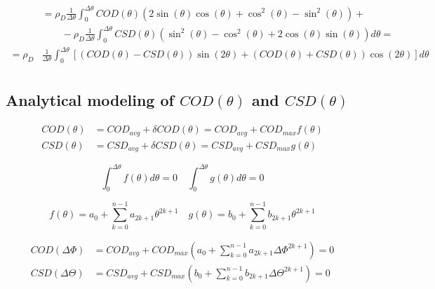 \documentclass[review]{elsarticle}
\begin{document}
\begin{equation}
\begin{aligned}
&=\rho_{D}\frac{1}{\Delta\theta}\int_{0}^{\Delta\theta}COD\left(\theta\right)\left(2\sin{\left(\theta\right)}\cos{\left(\theta\right)}+\cos^{2}{\left(\theta\right)}-\sin^{2}\left(\theta\right)\right)+\\
&\qquad-\rho_{D}\frac{1}{\Delta\theta}\int_{0}^{\Delta\theta}CSD\left(\theta\right)\left(\sin^{2}{\left(\theta\right)}-\cos^{2}{\left(\theta\right)}+2\cos{\left(\theta\right)}\sin{\left(\theta\right)}\right)d\theta=\\
=\rho_{D}&\frac{1}{\Delta\theta}\int_{0}^{\Delta\theta}\left[\left(COD\left(\theta\right)-CSD\left(\theta\right)\right)\sin\left(2\theta\right)+\left(COD\left(\theta\right)+CSD\left(\theta\right)\right)\cos\left(2\theta\right)\right]d\theta\\
\end{aligned}
\end{equation}

\subsection{Analytical modeling of $COD\left(\theta\right)$ and $CSD\left(\theta\right)$}

\begin{equation}
\begin{aligned}
COD\left(\theta\right)&=COD_{avg}+\delta COD\left(\theta\right)=COD_{avg}+COD_{max}f\left(\theta\right)\\
CSD\left(\theta\right)&=CSD_{avg}+\delta CSD\left(\theta\right)=CSD_{avg}+CSD_{max}g\left(\theta\right)
\end{aligned}
\end{equation}

\begin{equation}
\int_{0}^{\Delta\theta}f\left(\theta\right)d\theta=0\quad\int_{0}^{\Delta\theta}g\left(\theta\right)d\theta=0
\end{equation}

\begin{equation}
f\left(\theta\right)=a_{0}+\sum_{k=0}^{n-1}a_{2k+1}\theta^{2k+1}\quad g\left(\theta\right)=b_{0}+\sum_{k=0}^{n-1}b_{2k+1}\theta^{2k+1}
\end{equation}

\begin{equation}
\begin{aligned}
COD\left(\Delta\Phi\right)&=COD_{avg}+COD_{max}\left(a_{0}+\sum_{k=0}^{n-1}a_{2k+1}\Delta\Phi^{2k+1}\right)=0\\
CSD\left(\Delta\Theta\right)&=CSD_{avg}+CSD_{max}\left(b_{0}+\sum_{k=0}^{n-1}b_{2k+1}\Delta\Theta^{2k+1}\right)=0
\end{aligned}
\end{equation}
\end{document}
